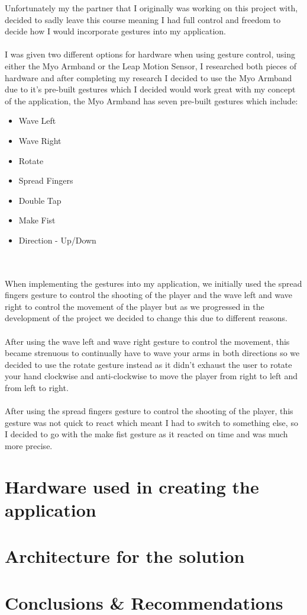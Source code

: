 \documentclass{article}
\begin{document}
Unfortunately my the partner that I originally was working on this project with, decided to sadly leave this course meaning I had full control and freedom to decide how I would incorporate gestures into my application.\\ \\
I was given two different options for hardware when using gesture control, using either the Myo Armband or the Leap Motion Sensor, I researched both pieces of hardware and after completing my research I decided to use the Myo Armband due to it's pre-built gestures which I decided would work great with my concept of the application, the Myo Armband has seven pre-built gestures which include:

\begin{itemize}
    \item Wave Left
    \item Wave Right
    \item Rotate
    \item Spread Fingers
    \item Double Tap
    \item Make Fist
    \item Direction - Up/Down
\end{itemize}
\\ \\
When implementing the gestures into my application, we initially used the spread fingers gesture to control the shooting of the player and the wave left and wave right to control the movement of the player but as we progressed in the development of the project we decided to change this due to different reasons.\\ \\
After using the wave left and wave right gesture to control the movement, this became strenuous to continually have to wave your arms in both directions so we decided to use the rotate gesture instead as it didn't exhaust the user to rotate your hand clockwise and anti-clockwise to move the player from right to left and from left to right.\\ \\
After using the spread fingers gesture to control the shooting of the player, this gesture was not quick to react which meant I had to switch to something else, so I decided to go with the make fist gesture as it reacted on time and was much more precise.

\section{Hardware used in creating the application}

\section{Architecture for the solution}

\section{Conclusions \& Recommendations}
\end{document}
